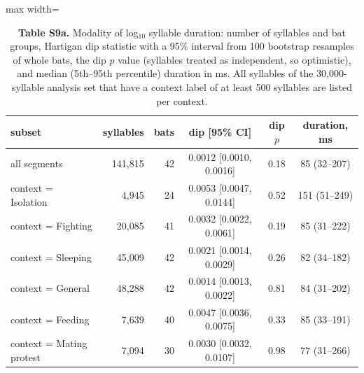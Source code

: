 \begin{table}[htbp]\centering\scriptsize
\caption{\textbf{Table S9a.} Modality of log$_{10}$ syllable duration: number of syllables and bat groups, Hartigan dip statistic with a 95\% interval from 100 bootstrap resamples of whole bats, the dip $p$ value (syllables treated as independent, so optimistic), and median (5th--95th percentile) duration in ms. All syllables of the 30,000-syllable analysis set that have a context label of at least 500 syllables are listed per context.}\label{tab:S9a}
\begin{adjustbox}{max width=\linewidth}
\begin{tabular}{lrrccc}
\toprule
subset & syllables & bats & dip [95\% CI] & dip $p$ & duration, ms \\
\midrule
all segments & 141,815 & 42 & 0.0012 [0.0010, 0.0016] & 0.18 & 85 (32--207) \\
context = Isolation & 4,945 & 24 & 0.0053 [0.0047, 0.0144] & 0.52 & 151 (51--249) \\
context = Fighting & 20,085 & 41 & 0.0032 [0.0022, 0.0061] & 0.19 & 85 (31--222) \\
context = Sleeping & 45,009 & 42 & 0.0021 [0.0014, 0.0029] & 0.26 & 82 (34--182) \\
context = General & 48,288 & 42 & 0.0014 [0.0013, 0.0022] & 0.81 & 84 (31--202) \\
context = Feeding & 7,639 & 40 & 0.0047 [0.0036, 0.0075] & 0.33 & 85 (33--191) \\
context = Mating protest & 7,094 & 30 & 0.0030 [0.0032, 0.0107] & 0.98 & 77 (31--266) \\
\bottomrule
\end{tabular}
\end{adjustbox}
\end{table}
